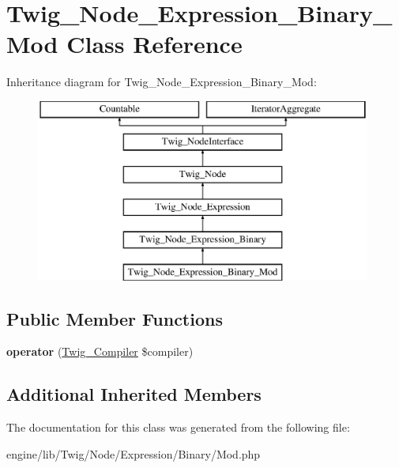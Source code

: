 \hypertarget{class_twig___node___expression___binary___mod}{}\section{Twig\+\_\+\+Node\+\_\+\+Expression\+\_\+\+Binary\+\_\+\+Mod Class Reference}
\label{class_twig___node___expression___binary___mod}
Inheritance diagram for Twig\+\_\+\+Node\+\_\+\+Expression\+\_\+\+Binary\+\_\+\+Mod\+:\begin{figure}[H]
\begin{center}
\leavevmode
\includegraphics[height=6.000000cm]{class_twig___node___expression___binary___mod}
\end{center}
\end{figure}
\subsection*{Public Member Functions}
\begin{DoxyCompactItemize}
\item 
\hypertarget{class_twig___node___expression___binary___mod_af77318ec88d5f8a508684970a150b670}{}{\bfseries operator} (\hyperlink{class_twig___compiler}{Twig\+\_\+\+Compiler} \$compiler)\label{class_twig___node___expression___binary___mod_af77318ec88d5f8a508684970a150b670}

\end{DoxyCompactItemize}
\subsection*{Additional Inherited Members}


The documentation for this class was generated from the following file\+:\begin{DoxyCompactItemize}
\item 
engine/lib/\+Twig/\+Node/\+Expression/\+Binary/Mod.\+php\end{DoxyCompactItemize}

